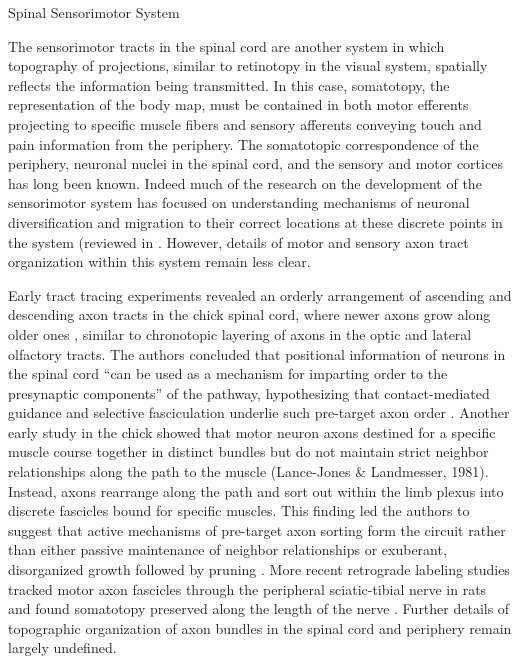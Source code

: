 Spinal Sensorimotor System

The sensorimotor tracts in the spinal cord are another system in which topography of projections, similar to retinotopy in the visual system, spatially reflects the information being transmitted.
In this case, somatotopy, the representation of the body map, must be contained in both motor efferents projecting to specific muscle fibers and sensory afferents conveying touch and pain information from the periphery.
The somatotopic correspondence of the periphery, neuronal nuclei in the spinal cord, and the sensory and motor cortices has long been known.
Indeed much of the research on the development of the sensorimotor system has focused on understanding mechanisms of neuronal diversification and migration to their correct locations at these discrete points in the system (reviewed in \cite{kania2014spinal}.
However, details of motor and sensory axon tract organization within this system remain less clear.

Early tract tracing experiments revealed an orderly arrangement of ascending and descending axon tracts in the chick spinal cord, where newer axons grow along older ones \cite{nornes1980pattern}, similar to chronotopic layering of axons in the optic and lateral olfactory tracts.
The authors concluded that positional information of neurons in the spinal cord “can be used as a mechanism for imparting order to the presynaptic components” of the pathway, hypothesizing that contact-mediated guidance and selective fasciculation underlie such pre-target axon order \cite{nornes1980pattern}.
Another early study in the chick showed that motor neuron axons destined for a specific muscle course together in distinct bundles but do not maintain strict neighbor relationships along the path to the muscle (Lance-Jones \& Landmesser, 1981)\cite{lance1981pathway}.
Instead, axons rearrange along the path and sort out within the limb plexus into discrete fascicles bound for specific muscles.
This finding led the authors to suggest that active mechanisms of pre-target axon sorting form the circuit rather than either passive maintenance of neighbor relationships or exuberant, disorganized growth followed by pruning \cite{lance1981pathway}.
More recent retrograde labeling studies tracked motor axon fascicles through the peripheral sciatic-tibial nerve in rats and found somatotopy preserved along the length of the nerve \cite{badia2010topographical}.
Further details of topographic organization of axon bundles in the spinal cord and periphery remain largely undefined.

